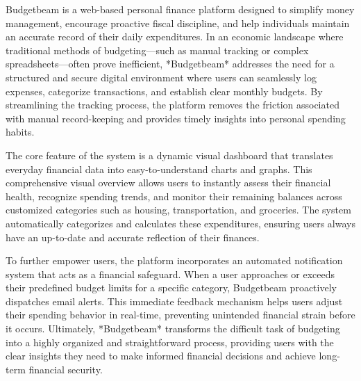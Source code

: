 Budgetbeam is a web-based personal finance platform designed to simplify money management, encourage proactive fiscal discipline, and help individuals maintain an accurate record of their daily expenditures. In an economic landscape where traditional methods of budgeting—such as manual tracking or complex spreadsheets—often prove inefficient, *Budgetbeam* addresses the need for a structured and secure digital environment where users can seamlessly log expenses, categorize transactions, and establish clear monthly budgets. By streamlining the tracking process, the platform removes the friction associated with manual record-keeping and provides timely insights into personal spending habits.

The core feature of the system is a dynamic visual dashboard that translates everyday financial data into easy-to-understand charts and graphs. This comprehensive visual overview allows users to instantly assess their financial health, recognize spending trends, and monitor their remaining balances across customized categories such as housing, transportation, and groceries. The system automatically categorizes and calculates these expenditures, ensuring users always have an up-to-date and accurate reflection of their finances. 

To further empower users, the platform incorporates an automated notification system that acts as a financial safeguard. When a user approaches or exceeds their predefined budget limits for a specific category, Budgetbeam proactively dispatches email alerts. This immediate feedback mechanism helps users adjust their spending behavior in real-time, preventing unintended financial strain before it occurs. Ultimately, *Budgetbeam* transforms the difficult task of budgeting into a highly organized and straightforward process, providing users with the clear insights they need to make informed financial decisions and achieve long-term financial security.
